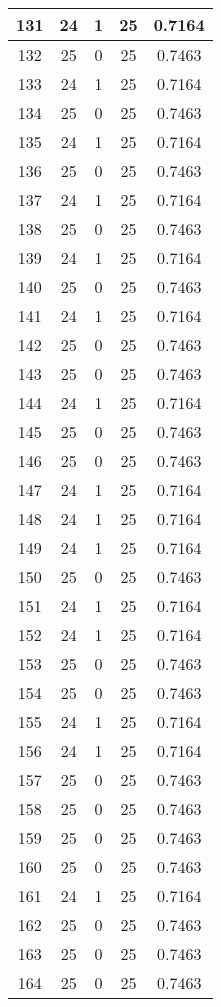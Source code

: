 \documentclass[letterpaper, 12pt]{article}
\begin{document}
\begin{longtable}{|c|c|c|c|c|}
\hline
131 & 24 & 1 & 25 & 0.7164 \\
\hline
132 & 25 & 0 & 25 & 0.7463 \\
\hline
133 & 24 & 1 & 25 & 0.7164 \\
\hline
134 & 25 & 0 & 25 & 0.7463 \\
\hline
135 & 24 & 1 & 25 & 0.7164 \\
\hline
136 & 25 & 0 & 25 & 0.7463 \\
\hline
137 & 24 & 1 & 25 & 0.7164 \\
\hline
138 & 25 & 0 & 25 & 0.7463 \\
\hline
139 & 24 & 1 & 25 & 0.7164 \\
\hline
140 & 25 & 0 & 25 & 0.7463 \\
\hline
141 & 24 & 1 & 25 & 0.7164 \\
\hline
142 & 25 & 0 & 25 & 0.7463 \\
\hline
143 & 25 & 0 & 25 & 0.7463 \\
\hline
144 & 24 & 1 & 25 & 0.7164 \\
\hline
145 & 25 & 0 & 25 & 0.7463 \\
\hline
146 & 25 & 0 & 25 & 0.7463 \\
\hline
147 & 24 & 1 & 25 & 0.7164 \\
\hline
148 & 24 & 1 & 25 & 0.7164 \\
\hline
149 & 24 & 1 & 25 & 0.7164 \\
\hline
150 & 25 & 0 & 25 & 0.7463 \\
\hline
151 & 24 & 1 & 25 & 0.7164 \\
\hline
152 & 24 & 1 & 25 & 0.7164 \\
\hline
153 & 25 & 0 & 25 & 0.7463 \\
\hline
154 & 25 & 0 & 25 & 0.7463 \\
\hline
155 & 24 & 1 & 25 & 0.7164 \\
\hline
156 & 24 & 1 & 25 & 0.7164 \\
\hline
157 & 25 & 0 & 25 & 0.7463 \\
\hline
158 & 25 & 0 & 25 & 0.7463 \\
\hline
159 & 25 & 0 & 25 & 0.7463 \\
\hline
160 & 25 & 0 & 25 & 0.7463 \\
\hline
161 & 24 & 1 & 25 & 0.7164 \\
\hline
162 & 25 & 0 & 25 & 0.7463 \\
\hline
163 & 25 & 0 & 25 & 0.7463 \\
\hline
164 & 25 & 0 & 25 & 0.7463 \\

\end{longtable}
\end{document}
